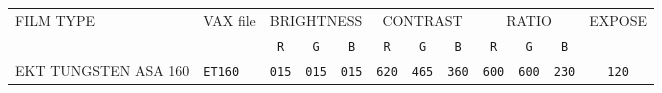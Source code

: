 \begin{table}[htb]
\begin{center}
\begin{tabular}{|l|l|c|c|c|c|c|c|c|c|c|c|}
\hline
{FILM TYPE} & {VAX file} &
\multicolumn{3}{|c|}{{BRIGHTNESS}} &
\multicolumn{3}{|c|}{{CONTRAST}} &
\multicolumn{3}{|c|}{{RATIO}} & {EXPOSE} \\
\cline {3-11}
& & {\tt R} & {\tt G} & {\tt B} & {\tt R} & {\tt G} &
{\tt B}& {\tt R} &  {\tt G} & {\tt B} & \\
\hline

%
%
%
%
%
%
%
%
{EKT \scriptsize TUNGSTEN ASA 160} & {\tt ET160} & {\tt 015} & {\tt 015} &
{\tt 015} & {\tt 620} & {\tt 465} & {\tt 360} & {\tt 600} & {\tt 600} &
{\tt 230} & {\tt 120} \\


\end{tabular}
\end{center}
\end{table}
